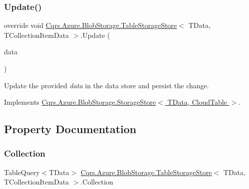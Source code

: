 \subsubsection{\texorpdfstring{Update()}{Update()}\hspace{0.1cm}{\footnotesize\ttfamily [2/2]}}
{\footnotesize\ttfamily override void \hyperlink{classCqrs_1_1Azure_1_1BlobStorage_1_1TableStorageStore}{Cqrs.\+Azure.\+Blob\+Storage.\+Table\+Storage\+Store}$<$ T\+Data, T\+Collection\+Item\+Data $>$.Update (\begin{DoxyParamCaption}\item[{T\+Data}]{data }\end{DoxyParamCaption})\hspace{0.3cm}{\ttfamily [virtual]}}



Update the provided {\itshape data}  in the data store and persist the change. 



Implements \hyperlink{classCqrs_1_1Azure_1_1BlobStorage_1_1StorageStore_ae9ca8bfe30040f77e349a4d47b31da70_ae9ca8bfe30040f77e349a4d47b31da70}{Cqrs.\+Azure.\+Blob\+Storage.\+Storage\+Store$<$ T\+Data, Cloud\+Table $>$}.



\subsection{Property Documentation}
\mbox{\label{classCqrs_1_1Azure_1_1BlobStorage_1_1TableStorageStore_a97752ec9c5ad130a230924da9a75a537_a97752ec9c5ad130a230924da9a75a537}} 
\subsubsection{\texorpdfstring{Collection}{Collection}}
{\footnotesize\ttfamily Table\+Query$<$T\+Data$>$ \hyperlink{classCqrs_1_1Azure_1_1BlobStorage_1_1TableStorageStore}{Cqrs.\+Azure.\+Blob\+Storage.\+Table\+Storage\+Store}$<$ T\+Data, T\+Collection\+Item\+Data $>$.Collection\hspace{0.3cm}{\ttfamily [get]}}



